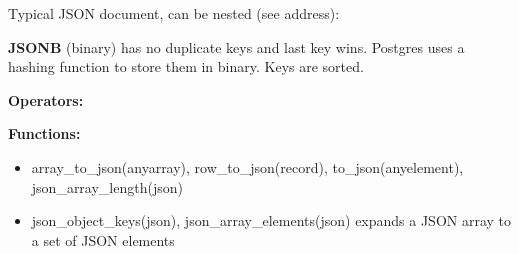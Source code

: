 \begin{breakbox}

Typical JSON document, can be nested (see address):

\textbf{JSONB} (binary) has no duplicate keys and last key wins. Postgres uses a hashing function to store them in binary. Keys are sorted.

\textbf{Operators:}

\textbf{Functions:}
	\begin{itemize}
		\item array\_to\_json(anyarray), row\_to\_json(record), to\_json(anyelement), json\_array\_length(json)
		\item json\_object\_keys(json), json\_array\_elements(json) expands a JSON array to a set of JSON elements
	\end{itemize}
\end{breakbox}